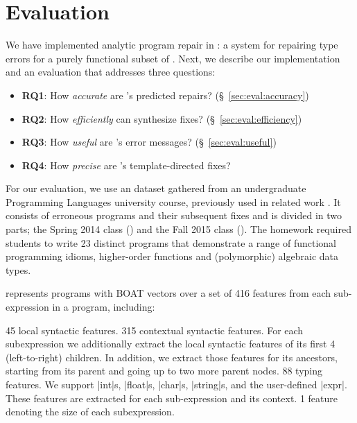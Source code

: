 \section{Evaluation}
\label{sec:eval}

\lstMakeShortInline[mathescape=true]{|}

We have implemented analytic program repair in \toolname: a system for 
repairing type errors for a purely functional subset of \ocaml. Next,
we describe our implementation and an evaluation that addresses three 
questions:

\begin{itemize}
    \item \textbf{RQ1}: How \emph{accurate} are \toolname's predicted repairs? 
                        (\S~\ref{sec:eval:accuracy}) 
    \item \textbf{RQ2}: How \emph{efficiently} can \toolname synthesize fixes?
                        (\S~\ref{sec:eval:efficiency}) 
    \item \textbf{RQ3}: How \emph{useful} are \toolname's error messages? 
                        (\S~\ref{sec:eval:useful}) 
    \item \textbf{RQ4}: How \emph{precise} are \toolname's template-directed fixes?

\end{itemize}


%
For our evaluation, we use an \ocaml dataset gathered from an undergraduate
Programming Languages university course, previously used in related work
\citep{yunounderstand,Seidel:2017}. It consists of erroneous programs and their
subsequent fixes and is divided in two parts; the Spring 2014 class (\SPRING)
and the Fall 2015 class (\FALL). The homework required students to write 23
distinct programs that demonstrate a range of functional programming idioms, \eg
higher-order functions and (polymorphic) algebraic data types.

%
\toolname represents programs with BOAT vectors over 
a set of 416 features from each sub-expression in a 
program, including: 

45 local syntactic features.
%
315 contextual syntactic features. For each subexpression we
additionally extract the local syntactic features of its first 4
(left-to-right) children. In addition, we extract those features for its
ancestors, starting from its parent and going up to two more parent nodes.
88 typing features. We support |int|s, |float|s, |char|s, |string|s, and
    the user-defined |expr|. These features are extracted for each
    sub-expression and its context.
% 
1 feature denoting the size of each subexpression.

